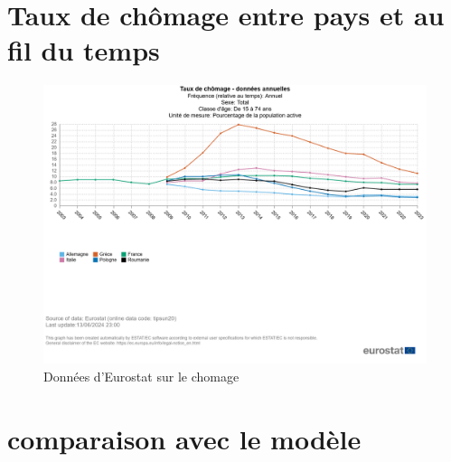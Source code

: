 \documentclass{article}
\begin{document}
\clearpage

\section{Taux de chômage entre pays et au fil du temps}
\begin{figure}[H]
  \centering
  \begin{minipage}{0.8\textwidth}
      \centering
      \includegraphics[width=\textwidth]{"chomage.png"}
      \caption{Données d'Eurostat sur le chomage}
  \end{minipage}
\end{figure}
\section{comparaison avec le modèle}
\end{document}
